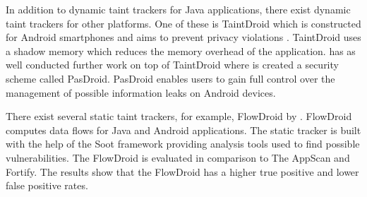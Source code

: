 In addition to dynamic taint trackers for Java applications, there exist dynamic taint trackers for other platforms. One of these is TaintDroid which is constructed for Android smartphones and aims to prevent privacy violations \parencite{EnckWilliam2014Taif}. TaintDroid uses a shadow memory which reduces the memory overhead of the application. \textcite{HsiaoS.W.2014PRse} has as well conducted further work on top of TaintDroid where is created a security scheme called PasDroid. PasDroid enables users to gain full control over the management of possible information leaks on Android devices.

There exist several static taint trackers, for example, FlowDroid by \textcite{ArztS.2014FPcf}. FlowDroid computes data flows for Java and Android applications. The static tracker is built with the help of the Soot framework \parencite{soot} providing analysis tools used to find possible vulnerabilities. The FlowDroid is evaluated in comparison to The AppScan and Fortify. The results show that the FlowDroid has a higher true positive and lower false positive rates.